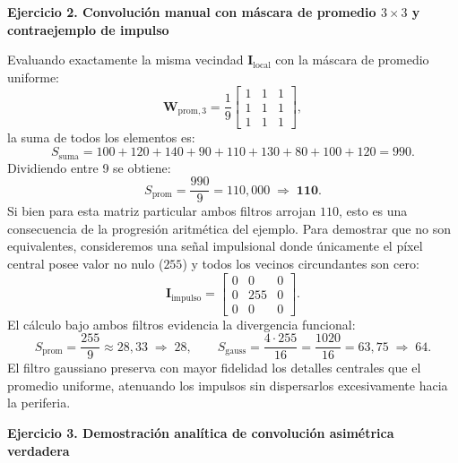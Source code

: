 \documentclass[11pt]{article}
\begin{document}
\textbf{Ejercicio 2. Convolución manual con máscara de promedio $3\times3$ y contraejemplo de impulso}

Evaluando exactamente la misma vecindad $\mathbf{I}_{\text{local}}$ con la máscara de promedio uniforme:
\begin{equation}
\mathbf{W}_{\text{prom}, 3} = \frac{1}{9} \begin{bmatrix} 1 & 1 & 1 \\ 1 & 1 & 1 \\ 1 & 1 & 1 \end{bmatrix},
\end{equation}
la suma de todos los elementos es:
\begin{equation}
S_{\text{suma}} = 100 + 120 + 140 + 90 + 110 + 130 + 80 + 100 + 120 = 990.
\end{equation}
Dividiendo entre 9 se obtiene:
\begin{equation}
S_{\text{prom}} = \frac{990}{9} = 110,000 \;\Rightarrow\; \mathbf{110}.
\end{equation}
Si bien para esta matriz particular ambos filtros arrojan $110$, esto es una consecuencia de la progresión aritmética del ejemplo. Para demostrar que no son equivalentes, consideremos una señal impulsional donde únicamente el píxel central posee valor no nulo ($255$) y todos los vecinos circundantes son cero:
\begin{equation}
\mathbf{I}_{\text{impulso}} = \begin{bmatrix} 0 & 0 & 0 \\ 0 & 255 & 0 \\ 0 & 0 & 0 \end{bmatrix}.
\end{equation}
El cálculo bajo ambos filtros evidencia la divergencia funcional:
\begin{equation}
S_{\text{prom}} = \frac{255}{9} \approx 28,33 \;\Rightarrow\; 28, \qquad S_{\text{gauss}} = \frac{4 \cdot 255}{16} = \frac{1020}{16} = 63,75 \;\Rightarrow\; 64.
\end{equation}
El filtro gaussiano preserva con mayor fidelidad los detalles centrales que el promedio uniforme, atenuando los impulsos sin dispersarlos excesivamente hacia la periferia.

\textbf{Ejercicio 3. Demostración analítica de convolución asimétrica verdadera}
\end{document}
